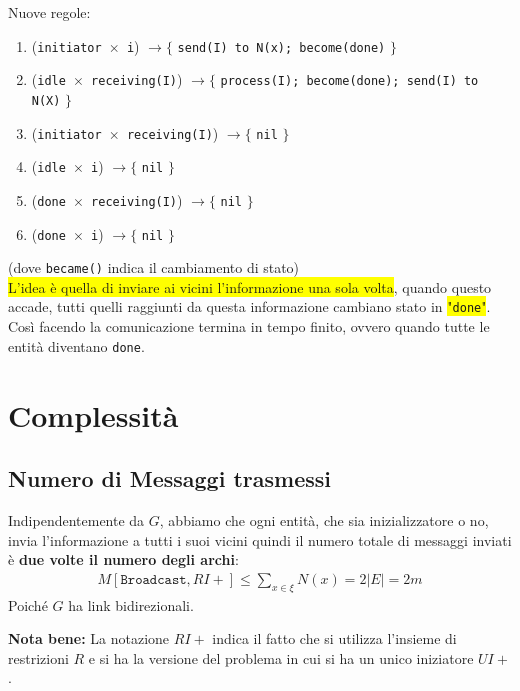 Nuove regole:
\begin{enumerate}
    \item (\texttt{initiator $\times$ i}) $\rightarrow \lbrace$ \texttt{send(I) to N(x);
              become(done)} $\rbrace$
    \item (\texttt{idle $\times$ receiving(I)}) $\rightarrow \lbrace$ \texttt{process(I);
              become(done); send(I) to N(X)} $\rbrace$
    \item (\texttt{initiator $\times$ receiving(I)}) $\rightarrow \lbrace$ \texttt{nil}
          $\rbrace$
    \item (\texttt{idle $\times$ i}) $\rightarrow \lbrace$ \texttt{nil} $\rbrace$
    \item (\texttt{done $\times$ receiving(I)}) $\rightarrow \lbrace$ \texttt{nil}
          $\rbrace$
    \item (\texttt{done $\times$ i}) $\rightarrow \lbrace$ \texttt{nil} $\rbrace$
\end{enumerate}

(dove \verb|became()| indica il cambiamento di stato)\\

\colorbox{yellow}{L'idea è quella di inviare ai vicini l'informazione una sola
    volta}, quando questo accade, tutti quelli raggiunti da questa informazione
cambiano stato in \colorbox{yellow}{"\texttt{done}"}. Così facendo la comunicazione
termina in tempo finito, ovvero quando tutte le entità diventano \texttt{done}.

\section{Complessità}
\subsection{Numero di Messaggi trasmessi}
Indipendentemente da $G$, abbiamo che ogni entità, che sia inizializzatore o no,
invia l'informazione a tutti i suoi vicini quindi il numero totale di messaggi
inviati è \textbf{due volte il numero degli archi}:
\begin{eqnarray}
    M[\texttt{Broadcast}, RI+]  \leq \sum_{x \in \xi} N(x) = 2|E| = 2m
    \nonumber
\end{eqnarray}
Poiché $G$ ha link bidirezionali.

\textbf{Nota bene:} La notazione $RI+$ indica il fatto che si utilizza l'insieme
di restrizioni $R$ e si ha la versione del problema in cui si ha un unico
iniziatore $UI+$.

